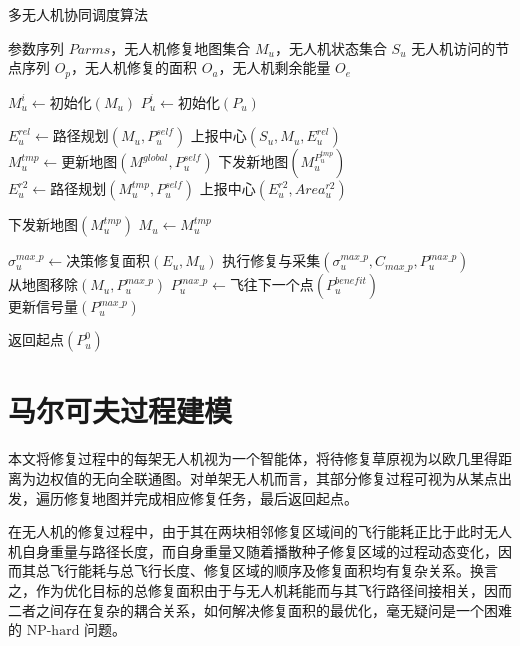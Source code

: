 \begin{algorithm}[H]
	\caption{多无人机协同调度算法}
	\label{alg:multi_uav_scheduling}
	\begin{algorithmic}[1]
		\Require 参数序列 $Parms$，无人机修复地图集合 $M_u$，无人机状态集合 $S_u$
		\Ensure 无人机访问的节点序列 $O_p$，无人机修复的面积 $O_a$，无人机剩余能量 $O_e$

		\State $M_u^i \gets \text{初始化}(M_u)$ 
		\State $P_u^i \gets \text{初始化}(P_u)$ 

		\State $E_u^{rel} \gets \text{路径规划}(M_u, P_u^{self})$ 
		\State $\text{上报中心}(S_u, M_u, E_u^{rel})$ 
		\State $M_u^{tmp} \gets \text{更新地图}(M^{global}, P_u^{self})$ 
		\State $\text{下发新地图}(M_u^{P_u^{tmp}})$ 
		\State $E_u^{r2} \gets \text{路径规划}(M_u^{tmp}, P_u^{self})$ 
		\State $\text{上报中心}(E_u^{r2}, Area_u^{r2})$ 

		\State $\text{下发新地图}(M_u^{tmp})$ 
		\State $M_u \gets M_u^{tmp}$
		\EndIf

		\State $\sigma_u^{max\_p} \gets \text{决策修复面积}(E_u, M_u)$ 
		\State $\text{执行修复与采集}(\sigma_u^{max\_p}, C_{max\_p}, P_u^{max\_p})$ 
		\State $\text{从地图移除}(M_u, P_u^{max\_p})$
		\State $P_u^{max\_p} \gets \text{飞往下一个点}(P_u^{benefit})$ 
		\State $\text{更新信号量}(P_u^{max\_p})$ 
		\EndWhile

		\State $\text{返回起点}(P_u^0)$ 
	\end{algorithmic}
\end{algorithm}

\section{马尔可夫过程建模}
本文将修复过程中的每架无人机视为一个智能体，将待修复草原视为以欧几里得距离为边权值的无向全联通图。对单架无人机而言，其部分修复过程可视为从某点出发，遍历修复地图并完成相应修复任务，最后返回起点。

在无人机的修复过程中，由于其在两块相邻修复区域间的飞行能耗正比于此时无人机自身重量与路径长度，而自身重量又随着播散种子修复区域的过程动态变化，因而其总飞行能耗与总飞行长度、修复区域的顺序及修复面积均有复杂关系。换言之，作为优化目标的总修复面积由于与无人机耗能而与其飞行路径间接相关，因而二者之间存在复杂的耦合关系，如何解决修复面积的最优化，毫无疑问是一个困难的 $\text{NP-hard}$ 问题。

